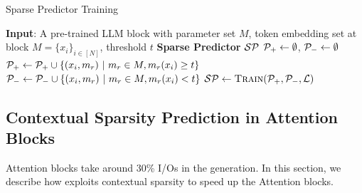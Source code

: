 


\begin{algorithm}
   \caption{Sparse Predictor Training}
   \label{alg:sparse_predictor_training}
\begin{algorithmic}
 \State \textbf{Input}: A pre-trained LLM block with parameter set $M$, token embedding set at block $M = \{ x_i \}_{i\in [N]}$, threshold $t$
\State \textbf{Sparse Predictor} ${\cal SP}$
\State ${\cal P}_+ \leftarrow \emptyset$, ${\cal P}_- \leftarrow \emptyset$ 
 \State ${\cal P}_+ \leftarrow {\cal P}_+ \cup \{(x_i, m_r ) ~|~ m_r \in M,  m_r(x_i) \geq t\}$
 \State ${\cal P}_- \leftarrow {\cal P}_- \cup \{(x_i, m_r ) ~|~ m_r \in M,  m_r(x_i) < t\}$
 \EndFor
\State ${\cal SP} \leftarrow \textsc{Train}( {\cal P}_{+}, {\cal P}_{-}, {\cal L})$  

\end{algorithmic}
\end{algorithm}


\subsection{Contextual Sparsity Prediction in Attention Blocks}
\label{sec:routing_attn}
Attention blocks take around 30\% I/Os in the generation. In this section, we describe how \name{} exploits contextual sparsity to speed up the Attention blocks.

